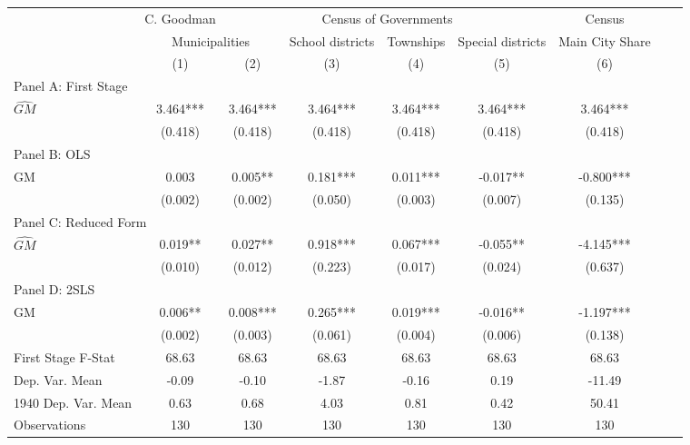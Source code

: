  \begin{tabular}{l*{8}{c}} \toprule
&\multicolumn{1}{c}{C. Goodman}&\multicolumn{4}{c}{Census of Governments}&\multicolumn{1}{c}{Census}\\\cmidrule(lr){2-2}\cmidrule(lr){3-6}\cmidrule(lr){7-7}
&\multicolumn{2}{c}{Municipalities}&\multicolumn{1}{c}{School districts}&\multicolumn{1}{c}{Townships}&\multicolumn{1}{c}{Special districts}&\multicolumn{1}{c}{Main City Share}\\\cmidrule(lr){2-3}\cmidrule(lr){4-6}\cmidrule(lr){7-7}
&\multicolumn{1}{c}{(1)}&\multicolumn{1}{c}{(2)}&\multicolumn{1}{c}{(3)}&\multicolumn{1}{c}{(4)}&\multicolumn{1}{c}{(5)}&\multicolumn{1}{c}{(6)}\\
\cmidrule(lr){1-7}
\multicolumn{6}{l}{Panel A: First Stage}\\
\cmidrule(lr){1-7}
$\widehat{GM}$  &    3.464***&    3.464***&    3.464***&    3.464***&    3.464***&    3.464***\\
                &  (0.418)   &  (0.418)   &  (0.418)   &  (0.418)   &  (0.418)   &  (0.418)   \\
\cmidrule(lr){1-7}
\multicolumn{6}{l}{Panel B: OLS}\\
\cmidrule(lr){1-7}
GM              &    0.003   &    0.005** &    0.181***&    0.011***&   -0.017** &   -0.800***\\
                &  (0.002)   &  (0.002)   &  (0.050)   &  (0.003)   &  (0.007)   &  (0.135)   \\
\cmidrule(lr){1-7}
\multicolumn{6}{l}{Panel C: Reduced Form}\\
\cmidrule(lr){1-7}
$\widehat{GM}$  &    0.019** &    0.027** &    0.918***&    0.067***&   -0.055** &   -4.145***\\
                &  (0.010)   &  (0.012)   &  (0.223)   &  (0.017)   &  (0.024)   &  (0.637)   \\
\cmidrule(lr){1-7}
\multicolumn{6}{l}{Panel D: 2SLS}\\
\cmidrule(lr){1-7}
GM              &    0.006** &    0.008***&    0.265***&    0.019***&   -0.016** &   -1.197***\\
                &  (0.002)   &  (0.003)   &  (0.061)   &  (0.004)   &  (0.006)   &  (0.138)   \\
\midrule
First Stage F-Stat&    68.63   &    68.63   &    68.63   &    68.63   &    68.63   &    68.63   \\
Dep. Var. Mean  &    -0.09   &    -0.10   &    -1.87   &    -0.16   &     0.19   &   -11.49   \\
1940 Dep. Var. Mean&     0.63   &     0.68   &     4.03   &     0.81   &     0.42   &    50.41   \\
Observations    &      130   &      130   &      130   &      130   &      130   &      130   \\
       \bottomrule \end{tabular}
